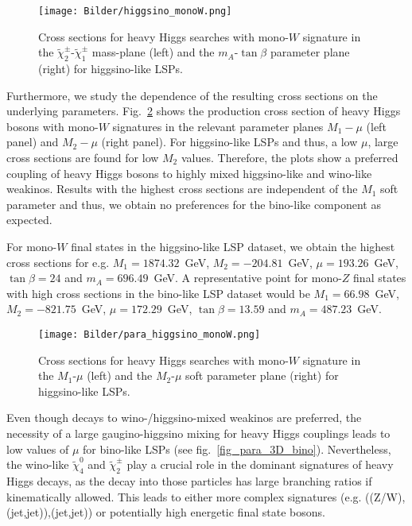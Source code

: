 \documentclass[11pt,a4paper]{article}
\begin{document}
\begin{figure}[h]
\centering
\texttt{[image: Bilder/higgsino\_monoW.png]}
\caption{Cross sections for heavy Higgs searches with mono-$W$ signature in the $\tilde{\chi}^\pm_2$-$\tilde{\chi}^\pm_1$ mass-plane (left) and the $m_A$-$\tan\beta$ parameter plane (right) for higgsino-like LSPs.}\label{fig_monow}
\end{figure}

Furthermore, we study the dependence of the resulting cross sections on the underlying parameters. Fig.~\ref{fig_para_3D_higgsino} shows the production cross section of heavy Higgs bosons with mono-$W$ signatures in the relevant parameter planes $M_1 - \mu$ (left panel) and $M_2 - \mu$ (right panel). For higgsino-like LSPs and thus, a low $\mu$, large cross sections are found for low $M_2$ values. Therefore, the plots show a preferred coupling of heavy Higgs bosons to highly mixed higgsino-like and wino-like weakinos. Results with the highest cross sections are independent of the $M_1$ soft parameter and thus, we obtain no preferences for the bino-like component as expected.

For mono-$W$ final states in the higgsino-like LSP dataset, we obtain the highest cross sections for e.g. $M_1 = 1874.32$~GeV, $M_2 = -204.81$~GeV, $\mu = 193.26$~GeV, $\tan\beta = 24$ and $m_A = 696.49$~GeV. A representative point for mono-$Z$ final states with high cross sections in the bino-like LSP dataset would be  $M_1 = 66.98$~GeV, $M_2 = -821.75$~GeV, $\mu = 172.29$~GeV, $\tan\beta = 13.59$ and $m_A = 487.23$~GeV.

\begin{figure}[h]
\centering
\texttt{[image: Bilder/para\_higgsino\_monoW.png]}
\caption{Cross sections for heavy Higgs searches with mono-$W$ signature in the $M_1$-$\mu$ (left) and the $M_2$-$\mu$ soft parameter plane (right) for higgsino-like LSPs.}\label{fig_para_3D_higgsino}
\end{figure}

Even though decays to wino-/higgsino-mixed weakinos are preferred, the necessity of a large gaugino-higgsino mixing for heavy Higgs couplings leads to low values of $\mu$ for bino-like LSPs (see fig.~\ref{fig_para_3D_bino}). Nevertheless, the wino-like $\tilde{\chi}^0_4$ and $\tilde{\chi}^\pm_2$ play a crucial role in the dominant signatures of heavy Higgs decays, as the decay into those particles has large branching ratios if kinematically allowed. This leads to either more complex signatures (e.g. ((Z/W),(jet,jet)),(jet,jet)) or potentially high energetic final state bosons.
\end{document}

